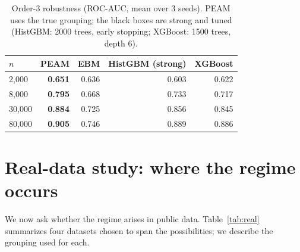 \documentclass{article}
\begin{document}
\begin{table}[t]
\centering
\caption{Order-3 robustness (ROC-AUC, mean over 3 seeds). PEAM uses the true
grouping; the black boxes are strong and tuned (HistGBM: 2000 trees, early
stopping; XGBoost: 1500 trees, depth 6).}
\label{tab:nsweep}
\begin{tabular}{lrrrr}
\toprule
$n$ & \textbf{PEAM} & EBM & HistGBM (strong) & XGBoost \\
\midrule
2{,}000  & \textbf{0.651} & 0.636 & 0.603 & 0.622 \\
8{,}000  & \textbf{0.795} & 0.668 & 0.733 & 0.717 \\
30{,}000 & \textbf{0.884} & 0.725 & 0.856 & 0.845 \\
80{,}000 & \textbf{0.905} & 0.746 & 0.889 & 0.886 \\
\bottomrule
\end{tabular}
\end{table}

\section{Real-data study: where the regime occurs}
\label{sec:real}

We now ask whether the regime arises in public data. Table~\ref{tab:real}
summarizes four datasets chosen to span the possibilities; we describe the
grouping used for each.
\end{document}
